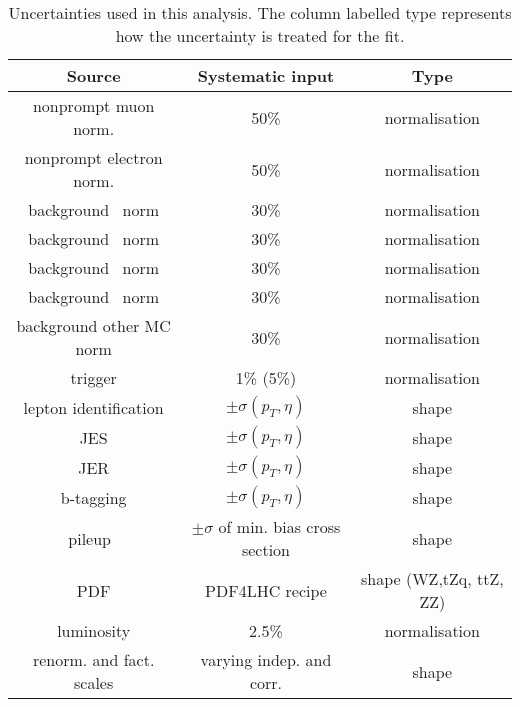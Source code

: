 \begin{table}[htbp]
	\centering
	\caption{Uncertainties used in this analysis. The column labelled type represents how the uncertainty is treated for the fit.}
	\begin{tabular}{ccc}
		\toprule
		Source & Systematic input & Type \\ 
		\midrule 
		nonprompt muon norm. & 50\% & normalisation \\ 
		 
		nonprompt electron norm. & 50\% & normalisation \\ 
		 
		background \ttZ\ norm & 30\% & normalisation \\ 
		 
		background \WZ\ norm & 30\% & normalisation \\ 
		 
		background \tZq\ norm & 30\% & normalisation \\ 
		 
		background \ZZ\ norm & 30\% & normalisation \\ 
		 
		background other MC norm & 30\% & normalisation \\ 
		 
		trigger & 1\% (5\%) & normalisation \\ 
		 
		lepton identification  & $\pm \sigma(p_{T},\eta)$ & shape \\ 
		 
		JES & $\pm \sigma(p_{T},\eta)$ & shape \\ 
		 
		JER & $\pm \sigma(p_{T},\eta)$ &  shape \\ 
		 
		b-tagging & $\pm \sigma(p_{T},\eta)$ & shape \\ 
		 
		pileup\ & $\pm \sigma$ of min. bias cross section &  shape \\ 
		 
		PDF & PDF4LHC recipe &  shape (WZ,tZq, ttZ, ZZ)  \\ 
		 
		luminosity & 2.5\% & normalisation \\ 
		 
		renorm. and fact. scales & varying indep. and corr. &  shape \\ 
		\bottomrule
	\end{tabular} 
	\label{tab:nuis}
\end{table}
